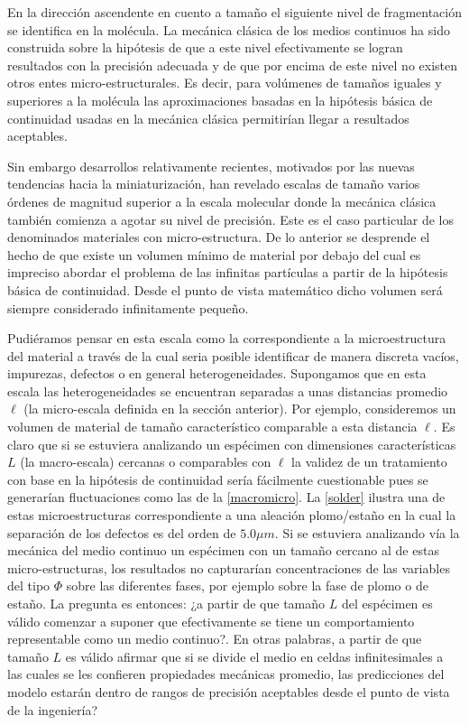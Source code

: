 \documentclass[../notas medios.tex]{subfiles}
\begin{document}
En la dirección ascendente en cuento a tamaño el siguiente nivel de fragmentación se identifica en la molécula.  La mecánica clásica de los medios continuos ha sido construida sobre la hipótesis de que a este nivel efectivamente se logran resultados con la precisión adecuada y de que por encima de este nivel no existen otros entes micro-estructurales.  Es decir, para volúmenes de tamaños iguales y superiores a la molécula las aproximaciones basadas en la hipótesis básica de continuidad usadas en la mecánica clásica permitirían llegar a resultados aceptables.

Sin embargo desarrollos relativamente recientes, motivados por las nuevas tendencias hacia la miniaturización, han revelado escalas de tamaño varios órdenes de magnitud superior a la escala molecular donde la mecánica clásica también comienza a agotar su nivel de precisión.  Este es el caso particular de los denominados materiales con micro-estructura.  De lo anterior se desprende el hecho de que existe un volumen mínimo de material por debajo del cual es impreciso abordar el problema de las infinitas partículas a partir de la hipótesis básica de continuidad.  Desde el punto de vista matemático dicho volumen será siempre considerado infinitamente pequeño.

Pudiéramos pensar en esta escala como la correspondiente a la microestructura
del material a través de la cual seria posible identificar de manera discreta
vacíos, impurezas, defectos o en general heterogeneidades.  Supongamos que en esta escala las heterogeneidades se encuentran separadas a unas distancias promedio $\ell$  (la micro-escala definida en la sección anterior).  Por ejemplo, consideremos un volumen de material de tamaño característico comparable a esta distancia $\ell$.  Es claro que si se estuviera analizando un espécimen con dimensiones características $L$ (la macro-escala) cercanas o comparables con $\ell$ la validez de un tratamiento con base en la hipótesis de continuidad sería fácilmente cuestionable pues se generarían fluctuaciones como las de la \cref{macromicro}.  La \cref{solder} ilustra una de estas microestructuras correspondiente a una aleación plomo/estaño en la cual la separación de los defectos es del orden de $5.0 \mu m$.  Si se estuviera analizando vía la mecánica del medio continuo un espécimen con un tamaño cercano al de estas micro-estructuras, los resultados no capturarían concentraciones de las variables del tipo $\Phi$ sobre las diferentes fases, por ejemplo sobre la fase de plomo o de estaño.  La pregunta es entonces: ¿a partir de que tamaño $L$ del espécimen es válido comenzar a suponer que efectivamente se tiene un comportamiento representable como un medio continuo?.  En otras palabras, a partir de que tamaño $L$ es válido afirmar que si se divide el medio en celdas infinitesimales a las cuales se les confieren propiedades mecánicas promedio, las predicciones del modelo estarán dentro de rangos de precisión aceptables desde el punto de vista de la ingeniería?
\end{document}
